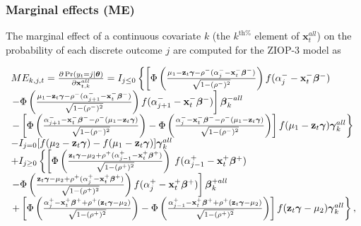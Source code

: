 \documentclass[letterpaper,fleqn,12pt]{article}
\begin{document}
\begin{onehalfspace}
\subsubsection*{Marginal effects (ME)}

\noindent The marginal effect of a continuous covariate $k$ (the $k^{\text{th%
}}$ element of $\mathbf{x}_{t}^{all}$) on the probability of each discrete
outcome $j$ are computed for the ZIOP-3 model as

\bigskip 

$%
\begin{array}{l}
ME_{k,j,t}=\frac{\partial \Pr (y_{t}=j|\mathbf{\theta })}{\partial \mathbf{x}%
_{t,k}^{all}}=I_{j\leq 0}\left\{ \left[ \Phi \left( \frac{\mu _{1}-\mathbf{z}%
_{t}\mathbf{\gamma }-\rho ^{-}(\alpha _{j}^{-}-\mathbf{x}_{t}^{-}\mathbf{%
\beta ^{-})}}{\sqrt{1-(\rho ^{-})^{2}}}\right) f(\alpha _{j}^{-}-\mathbf{x}%
_{t}^{-}\mathbf{\beta ^{-}})\right. \right.  \\ 
\left. -\Phi \left( \frac{\mu _{1}-\mathbf{z}_{t}\mathbf{\gamma }-\rho
^{-}(\alpha _{j+1}^{-}-\mathbf{x}_{t}^{-}\mathbf{\beta ^{-})}}{\sqrt{1-(\rho
^{-})^{2}}}\right) f(\alpha _{j+1}^{-}-\mathbf{x}_{t}^{-}\mathbf{\beta ^{-}})%
\right] \mathbf{\beta }_{k}^{-all} \\ 
\left. -\left[ \Phi \left( \frac{\alpha _{j+1}^{-}-\mathbf{x}_{t}^{-}\mathbf{%
\beta ^{-}}-\rho ^{-}(\mu _{1}-\mathbf{z}_{t}\mathbf{\gamma )}}{\sqrt{%
1-(\rho ^{-})^{2}}}\right) -\Phi \left( \frac{\alpha _{j}^{-}-\mathbf{x}%
_{t}^{-}\mathbf{\beta ^{-}}-\rho ^{-}(\mu _{1}-\mathbf{z}_{t}\mathbf{\gamma )%
}}{\sqrt{1-(\rho ^{-})^{2}}}\right) \right] f(\mu _{1}-\mathbf{z}_{t}\mathbf{%
\gamma })\mathbf{\gamma }_{k}^{all}\right\}  \\ 
-I_{j=0}[f(\mu _{2}-\mathbf{z}_{t}\mathbf{\gamma })-f(\mu _{1}-\mathbf{z}_{t}%
\mathbf{\gamma })]\mathbf{\gamma }_{k}^{all} \\ 
+I_{j\geq 0}\left\{ \left[ \Phi \left( \frac{\mathbf{z}_{t}\mathbf{\gamma }%
-\mu _{2}+\rho ^{+}(\alpha _{j-1}^{+}-\mathbf{x}_{t}^{+}\mathbf{\beta ^{+})}%
}{\sqrt{1-(\rho ^{+})^{2}}}\right) \right. \right. f(\alpha _{j-1}^{+}-%
\mathbf{x}_{t}^{+}\mathbf{\beta ^{+}}) \\ 
\left. -\Phi \left( \frac{\mathbf{z}_{t}\mathbf{\gamma }-\mu _{2}+\rho
^{+}(\alpha _{j}^{+}-\mathbf{x}_{t}^{+}\mathbf{\beta ^{+})}}{\sqrt{1-(\rho
^{+})^{2}}}\right) f(\alpha _{j}^{+}-\mathbf{x}_{t}^{+}\mathbf{\beta ^{+}})%
\right] \mathbf{\beta }_{k}^{+all} \\ 
\left. +\left[ \Phi \left( \frac{\alpha _{j}^{+}-\mathbf{x}_{t}^{+}\mathbf{%
\beta ^{+}}+\rho ^{+}(\mathbf{z}_{t}\mathbf{\gamma }-\mu _{2}\mathbf{)}}{%
\sqrt{1-(\rho ^{+})^{2}}}\right) -\Phi \left( \frac{\alpha _{j-1}^{+}-%
\mathbf{x}_{t}^{+}\mathbf{\beta ^{+}}+\rho ^{+}(\mathbf{z}_{t}\mathbf{\gamma 
}-\mu _{2}\mathbf{)}}{\sqrt{1-(\rho ^{+})^{2}}}\right) \right] f(\mathbf{z}%
_{t}\mathbf{\gamma }-\mu _{2})\mathbf{\gamma }_{k}^{all}\right\} ,%
\end{array}%
$


\end{onehalfspace}
\end{document}
